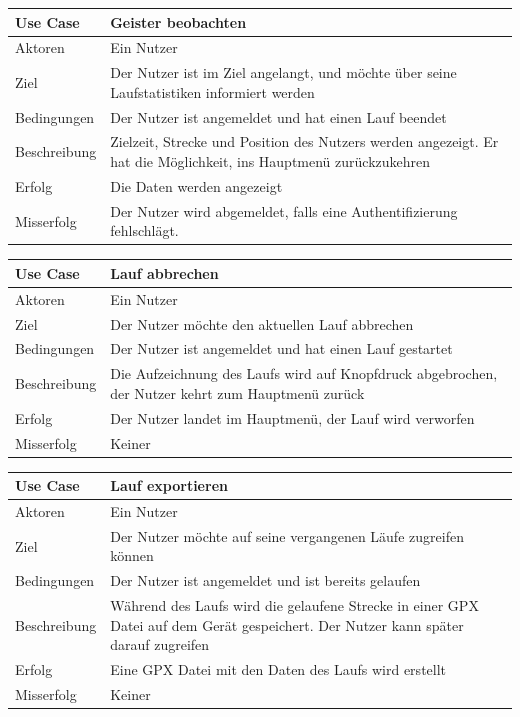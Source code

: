 \begin{tabular}{|p{}|p{}|}
\hline
\textbf{Use Case} & \textbf{Geister beobachten} \\ \hline \hline
Aktoren &  Ein Nutzer \\ \hline
Ziel &  Der Nutzer ist im Ziel angelangt, und möchte über seine Laufstatistiken informiert werden \\ \hline
Bedingungen &  Der Nutzer ist angemeldet und hat einen Lauf beendet \\ \hline
Beschreibung & Zielzeit, Strecke und Position des Nutzers werden angezeigt. Er hat die Möglichkeit, ins Hauptmenü zurückzukehren \\ \hline
Erfolg & Die Daten werden angezeigt \\ \hline
Misserfolg & Der Nutzer wird abgemeldet, falls eine Authentifizierung fehlschlägt. \\ \hline
\hline \end{tabular}
\begin{tabular}{|p{}|p{}|}
\hline
\textbf{Use Case} & \textbf{Lauf abbrechen} \\ \hline \hline
Aktoren &  Ein Nutzer \\ \hline
Ziel &  Der Nutzer möchte den aktuellen Lauf abbrechen \\ \hline
Bedingungen & Der Nutzer ist angemeldet und hat einen Lauf gestartet \\ \hline
Beschreibung & Die Aufzeichnung des Laufs wird auf Knopfdruck abgebrochen, der Nutzer kehrt zum Hauptmenü zurück \\ \hline
Erfolg & Der Nutzer landet im Hauptmenü, der Lauf wird verworfen \\ \hline
Misserfolg & Keiner \\ \hline
\hline \end{tabular}
\begin{tabular}{|p{}|p{}|}
\hline
\textbf{Use Case} & \textbf{Lauf exportieren} \\ \hline \hline
Aktoren &  Ein Nutzer \\ \hline
Ziel &  Der Nutzer möchte auf seine vergangenen Läufe zugreifen können \\ \hline
Bedingungen & Der Nutzer ist angemeldet und ist bereits gelaufen \\ \hline
Beschreibung & Während des Laufs wird die gelaufene Strecke in einer GPX Datei auf dem Gerät gespeichert. Der Nutzer kann später darauf zugreifen \\ \hline
Erfolg & Eine GPX Datei mit den Daten des Laufs wird erstellt \\ \hline
Misserfolg & Keiner \\ \hline
\hline \end{tabular}

